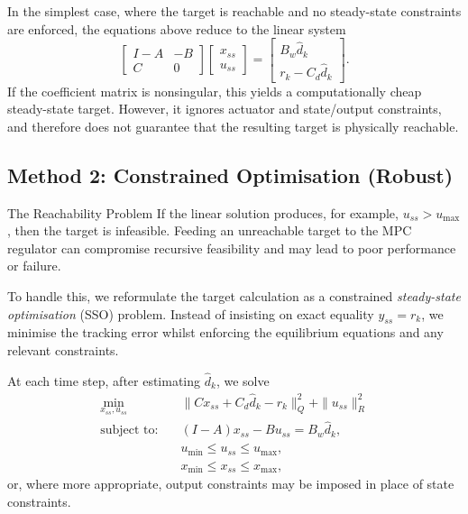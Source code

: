 In the simplest case, where the target is reachable and no steady-state constraints are enforced, the equations above reduce to the linear system
\begin{equation} \label{eq:target_calc}
	\begin{bmatrix}
		I - A & -B \\
		C & 0
	\end{bmatrix}
	\begin{bmatrix}
		x_{ss} \\
		u_{ss}
	\end{bmatrix}
	=
	\begin{bmatrix}
		B_w \hat d_k \\
		r_k - C_d \hat d_k
	\end{bmatrix}.
\end{equation}
If the coefficient matrix is nonsingular, this yields a computationally cheap steady-state target. However, it ignores actuator and state/output constraints, and therefore does not guarantee that the resulting target is physically reachable.

\subsection{Method 2: Constrained Optimisation (Robust)}

\begin{notebox}{The Reachability Problem}
	If the linear solution produces, for example, \(u_{ss} > u_{\max}\), then the target is infeasible. Feeding an unreachable target to the MPC regulator can compromise recursive feasibility and may lead to poor performance or failure.
\end{notebox}

To handle this, we reformulate the target calculation as a constrained \emph{steady-state optimisation} (SSO) problem. Instead of insisting on exact equality \(y_{ss}=r_k\), we minimise the tracking error whilst enforcing the equilibrium equations and any relevant constraints.

At each time step, after estimating \(\hat d_k\), we solve
\begin{align}
	\min_{x_{ss},u_{ss}} \quad &
	\|C x_{ss} + C_d \hat d_k - r_k\|_Q^2 + \|u_{ss}\|_R^2
	\label{eq:target_qp}\\
	\text{subject to:} \quad &
	(I-A)x_{ss} - B u_{ss} = B_w \hat d_k, \nonumber\\
	&
	u_{\min} \le u_{ss} \le u_{\max}, \nonumber\\
	&
	x_{\min} \le x_{ss} \le x_{\max}, \nonumber
\end{align}
or, where more appropriate, output constraints may be imposed in place of state constraints.

